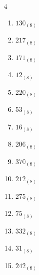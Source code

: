 \begin{multicols}{4}
\begin{enumerate}
  \item $130_{(8)}$

        \phantom{$=88$}

  \item $217_{(8)}$

        \phantom{$=143$}

  \item $171_{(8)}$

        \phantom{$=121$}

  \item $12_{(8)}$

        \phantom{$=10$}

\columnbreak %

\resetques

  \item $220_{(8)}$

        \phantom{$=144$}

  \item $53_{(8)}$

        \phantom{$=43$}

  \item $16_{(8)}$

        \phantom{$=14$}

  \item $206_{(8)}$

        \phantom{$=134$}

  \item $370_{(8)}$

        \phantom{$=248$}

  \item $212_{(8)}$

        \phantom{$=138$}

  \item $275_{(8)}$

        \phantom{$=189$}

  \item $75_{(8)}$

        \phantom{$=61$}

  \item $332_{(8)}$

        \phantom{$=218$}

  \item $31_{(8)}$

        \phantom{$=25$}

  \item $242_{(8)}$

        \phantom{$=162$}


\end{enumerate}
\end{multicols}
